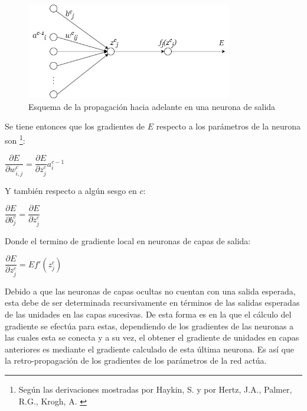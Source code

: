 \begin{figure}[H]
    \centering
    \includegraphics[width=0.8\textwidth]{Figuras/redes_neuronales/Forward_neurona.jpg}
    \caption{Esquema de la propagación hacia adelante en una neurona de salida} 
    \label{fig:Feed-forward}
\end{figure}

Se tiene entonces que los gradientes de $E$ respecto a los parámetros de la neurona son \footnote{Según las derivaciones mostradas por Haykin, S. y por Hertz, J.A., Palmer, R.G., Krogh, A. \cite{haykin2008neural} \cite{hertz1991introduction}}:

\begin{center}
    $\dfrac{\partial E}{\partial w_{i,j}^{c}} = \dfrac{\partial E}{\partial z_{j}^{c}}a_i^{c-1}$
\end{center}

Y también respecto a algún sesgo en $c$:

\begin{center}
    $\dfrac{\partial E}{\partial b^c_j} = \dfrac{\partial E}{\partial z_{j}^{c}}$
\end{center}

Donde el termino de gradiente local en neuronas de capas de salida:

\begin{center}
    $\dfrac{\partial E}{\partial z_{j}^{c}} = E f'(z^c_j)$
\end{center}

Debido a que las neuronas de capas ocultas no cuentan con una salida esperada, esta debe de ser determinada recursivamente en términos de las salidas esperadas de las unidades en las capas sucesivas. De esta forma es en la que el cálculo del gradiente se efectúa para estas, dependiendo de los gradientes de las neuronas a las cuales esta se conecta y a su vez, el obtener el gradiente de unidades en capas anteriores es mediante el gradiente calculado de esta última neurona. Es así que la retro-propagación de los gradientes de los parámetros de la red actúa.

